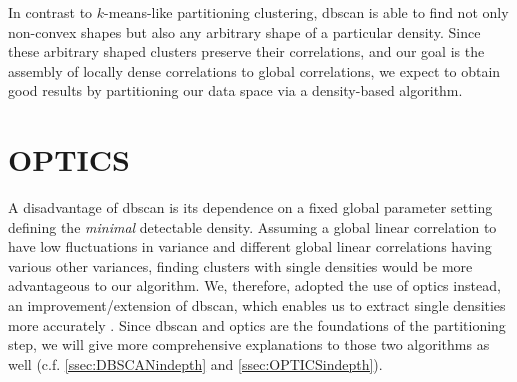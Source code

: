 In contrast to $k$-means-like partitioning clustering\cite{kmeansmacqueen1967some}, \gls{dbscan} is able to find not only non-convex shapes but also any arbitrary shape of a particular density. Since these arbitrary shaped clusters preserve their correlations, and our goal is the assembly of locally dense correlations to global correlations, we expect to obtain good results by partitioning our data space via a density-based algorithm.

\section{OPTICS}\label{sec:OPTICSintro}
A disadvantage of \gls{dbscan} is its dependence on a fixed global parameter setting defining the \textit{minimal} detectable density. Assuming a global linear correlation to have low fluctuations in variance and different global linear correlations having various other variances, finding clusters with single densities would be more advantageous to our algorithm. We, therefore, adopted the use of \gls{optics} instead, an improvement/extension of \gls{dbscan}, which enables us to extract single densities more accurately \cite{opticsankerst1999optics}. Since \gls{dbscan} and \gls{optics} are the foundations of the partitioning step, we will give more comprehensive explanations to those two algorithms as well (c.f. \autoref{ssec:DBSCANindepth} and \autoref{ssec:OPTICSindepth}).

    
